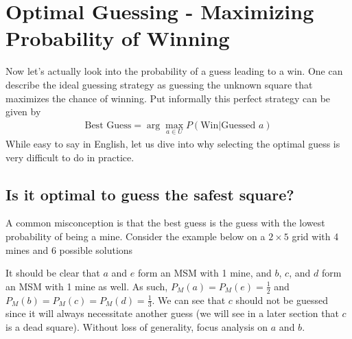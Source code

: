 \section{Optimal Guessing - Maximizing Probability of Winning}

Now let's actually look into the probability of a guess leading to a win. One can describe the ideal guessing strategy as guessing the unknown square that maximizes the chance of winning. Put informally this perfect strategy can be given by
\begin{align*}
    \text{Best Guess}=\arg\max_{a\in U}P(\text{Win}|\text{Guessed $a$})
\end{align*}
While easy to say in English, let us dive into why selecting the optimal guess is very difficult to do in practice.\\

\subsection{Is it optimal to guess the safest square?}\label{sec:ssmp_inacc}

A common misconception is that the best guess is the guess with the lowest probability of being a mine. Consider the example below on a $2\times5$ grid with 4 mines and 6 possible solutions
\begin{center}
    \begin{minipage}{0.25\linewidth}\centering{}\end{minipage}
\end{center}
It should be clear that $a$ and $e$ form an MSM with 1 mine, and $b$, $c$, and $d$ form an MSM with 1 mine as well. As such, $P_M(a)=P_M(e)=\frac{1}{2}$ and $P_M(b)=P_M(c)=P_M(d)=\frac{1}{3}$. We can see that $c$ should not be guessed since it will always necessitate another guess (we will see in a later section that $c$ is a dead square). Without loss of generality, focus analysis on $a$ and $b$.\\

